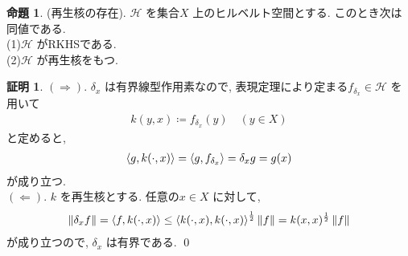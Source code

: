 \documentclass[10pt, fleqn, label-section=none]{bxjsarticle}
\theoremstyle{definition}
\newtheorem{prop}[dfn]{命題}
\newtheorem*{pf*}{証明}
\newcommand{\tbra}[1]{\mleft\langle#1\mright\rangle}
\newcommand{\norm}[1]{\left\|#1\right\|}
\newcommand{\naraba}{\Rightarrow}
\newcommand{\gyaku}{\Leftarrow}
\renewcommand{\;}{\, ; \,}
\begin{document}
\begin{prop}(再生核の存在). $\mathcal H$ を集合$X$ 上のヒルベルト空間とする. このとき次は同値である. \\
(1)$\mathcal H$ がRKHSである. \\
(2)$\mathcal H$ が再生核をもつ. 

\end{prop}
\begin{pf*}
$(\naraba)$. $\delta_x$ は有界線型作用素なので, 表現定理により定まる$f_{\delta_x} \in \mathcal H$ を用いて
\begin{align*} k(y, x) \coloneqq f_{\delta_x}(y) \quad (y \in X)\end{align*}
と定めると, 
\begin{align*} \tbra{g, k(\cdot, x)} = \tbra{g, f_{\delta_x}} = \delta_x g = g(x)\end{align*}
が成り立つ. \\
$(\gyaku)$. $k$ を再生核とする. 任意の$x \in X$ に対して, 
\begin{align*} \norm{\delta_x f} = \tbra{f, k(\cdot, x)} \leq \tbra{k(\cdot, x), k(\cdot, x)}^{\frac{1}{2}} \norm{f} = k(x, x)^{\frac{1}{2}} \norm{f} \end{align*}
が成り立つので, $\delta_x$ は有界である. 
\qed
\end{pf*}
\end{document}
